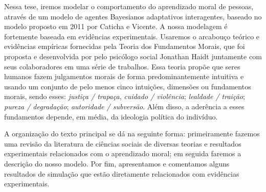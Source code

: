 Nessa tese, iremos modelar o comportamento do aprendizado moral de pessoas,
através de um modelo de agentes Bayesianos adaptativos interagentes, baseado
no modelo proposto em 2011 por Caticha e Vicente. A
nossa modelagem é fortemente baseada em evidências experimentais. Usaremos
o arcabouço teórico e evidências empíricas fornecidas pela Teoria dos
Fundamentos Morais, que foi proposta e desenvolvida por pelo psicólogo
social Jonathan Haidt juntamente com seus colaboradores em uma série de
trabalhos.  Essa teoria propõe que seres humanos fazem julgamentos morais
de forma predominantemente intuitiva e usando um conjunto de pelo menos cinco
intuições, dimensões ou fundamentos morais, sendo esses: \textit{justiça /
trapaça}, \textit{cuidado / violência}; \textit{lealdade / traição};
\textit{pureza / degradação}; \textit{autoridade / subversão}. Além disso,
a aderência a esses fundamentos depende, em média, da ideologia política
do indivíduo.

A organização do texto principal se dá na seguinte forma: primeiramente
fazemos uma revisão da literatura de ciências sociais de diversas teorias
e resultados experimentais relacionados com o aprendizado moral; em seguida
faremos a descrição do nosso modelo. Por fim, apresentamos e comentamos
alguns resultados de simulação que estão diretamente relacionados com
evidências experimentais. 

